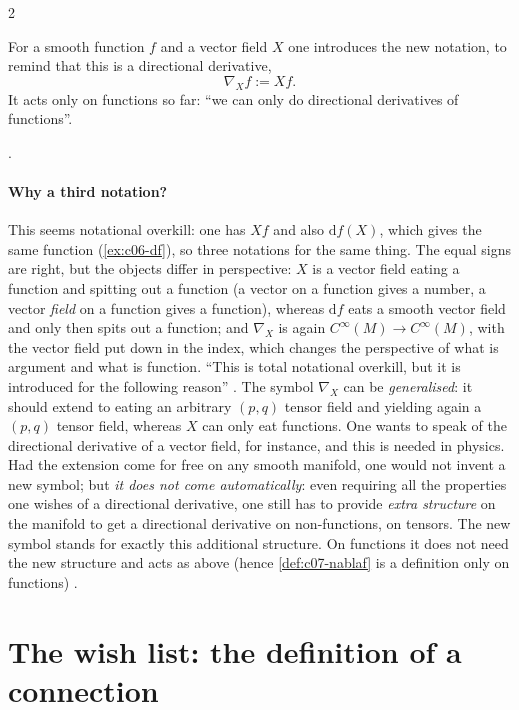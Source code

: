\begin{paracol}{2}
\begin{definition}\label{def:c07-nablaf}
For a smooth function $f$ and a vector field $X$ one introduces the new notation, to remind that this is a directional derivative,
\[
  \nabla_Xf:=Xf.
\]
It acts only on functions so far: ``we can only do directional derivatives of functions''.
\end{definition}
.

\paragraph{Why a third notation?} This seems notational overkill: one has $Xf$ and also $\mathrm df(X)$, which gives the same function (\cref{ex:c06-df}), so three notations for the same thing. The equal signs are right, but the objects differ in perspective: $X$ is a vector field eating a function and spitting out a function (a vector on a function gives a number, a vector \emph{field} on a function gives a function), whereas $\mathrm df$ eats a smooth vector field and only then spits out a function; and $\nabla_X$ is again $C^\infty(M)\to C^\infty(M)$, with the vector field put down in the index, which changes the perspective of what is argument and what is function. ``This is total notational overkill, but it is introduced for the following reason'' .
The symbol $\nabla_X$ can be \emph{generalised}: it should extend to eating an arbitrary $(p,q)$ tensor field and yielding again a $(p,q)$ tensor field, whereas $X$ can only eat functions. One wants to speak of the directional derivative of a vector field, for instance, and this is needed in physics. Had the extension come for free on any smooth manifold, one would not invent a new symbol; but \emph{it does not come automatically}: even requiring all the properties one wishes of a directional derivative, one still has to provide \emph{extra structure} on the manifold to get a directional derivative on non-functions, on tensors. The new symbol stands for exactly this additional structure. On functions it does not need the new structure and acts as above (hence \cref{def:c07-nablaf} is a definition only on functions)
.

\section{The wish list: the definition of a connection}\label{sec:c07-wish}


\end{paracol}
